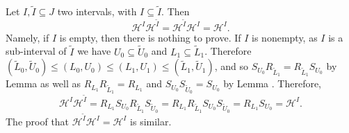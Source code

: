 \begin{remark}
Let $I,\tilde{I}\subseteq J$ two intervals, with $I\subseteq \tilde{I}$. Then
\[
\mathcal{H}^I\mathcal{H}^{\tilde{I}}=\mathcal{H}^{\tilde{I}}\mathcal{H}^I=\mathcal{H}^I.
\] 
Namely, if $I$ is empty, then there is nothing to prove. If $I$ is nonempty, as $I$
is a sub-interval of $\tilde{I}$ we have $U_0\subseteq \tilde{U}_0$ and $L_1\subseteq \tilde{L}_1$. Therefore $(\tilde{L}_0,\tilde{U}_0)\leq (L_0,U_0)\leq (L_1,U_1)\leq (\tilde{L}_1,\tilde{U}_1)$, and so $S_{U_0}R_{\tilde{L}_1}=R_{\tilde{L}_1}S_{U_0}$ by Lemma  as well as $R_{L_1}R_{\tilde{L}_1}=R_{L_1}$ and $S_{U_0}S_{\tilde{U}_0}=S_{U_0}$ by Lemma . Therefore,
\[
\mathcal{H}^I\mathcal{H}^{\tilde{I}}=R_{L_1}S_{U_0}R_{\tilde{L}_1}S_{\tilde{U}_0}=R_{L_1}R_{\tilde{L}_1}S_{U_0}S_{\tilde{U}_0}=R_{L_1}S_{U_0}=\mathcal{H}^I.
\]
The proof that $\mathcal{H}^{\tilde{I}}\mathcal{H}^I=\mathcal{H}^I$ is similar.
\end{remark}

